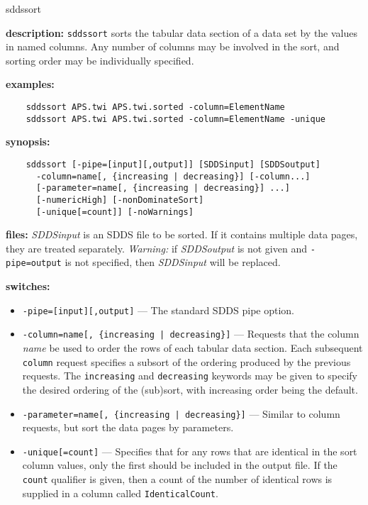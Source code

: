 \begin{sddsprog}{sddssort}
  \item \textbf{description:} \verb|sddssort| sorts the tabular data section of a data set by the values in named columns.
    Any number of columns may be involved in the sort, and sorting order may be individually specified.
  \item \textbf{examples:}
    \begin{verbatim}
    sddssort APS.twi APS.twi.sorted -column=ElementName
    sddssort APS.twi APS.twi.sorted -column=ElementName -unique
    \end{verbatim}
  \item \textbf{synopsis:}
    \begin{verbatim}
    sddssort [-pipe=[input][,output]] [SDDSinput] [SDDSoutput]
      -column=name[, {increasing | decreasing}] [-column...]
      [-parameter=name[, {increasing | decreasing}] ...]
      [-numericHigh] [-nonDominateSort]
      [-unique[=count]] [-noWarnings]
    \end{verbatim}
  \item \textbf{files:} \emph{SDDSinput} is an SDDS file to be sorted. If it contains multiple data pages, they are treated
    separately. \emph{Warning:} if \emph{SDDSoutput} is not given and \verb|-pipe=output| is not specified, then
    \emph{SDDSinput} will be replaced.
  \item \textbf{switches:}
    \begin{itemize}
      \item \verb|-pipe=[input][,output]| --- The standard SDDS pipe option.
      \item \verb!-column=name[, {increasing | decreasing}]! --- Requests that the column \emph{name} be used to order the rows of each tabular data section. Each subsequent \verb|column| request specifies a subsort of the ordering produced by the previous requests. The \verb|increasing| and \verb|decreasing| keywords may be given to specify the desired ordering of the (sub)sort, with increasing order being the default.
      \item \verb!-parameter=name[, {increasing | decreasing}]! --- Similar to column requests, but sort the data pages by parameters.
      \item \verb|-unique[=count]| --- Specifies that for any rows that are identical in the sort column values, only the first should be included in the output file. If the \verb|count| qualifier is given, then a count of the number of identical rows is supplied in a column called \verb|IdenticalCount|.

\end{itemize}
\end{sddsprog}
